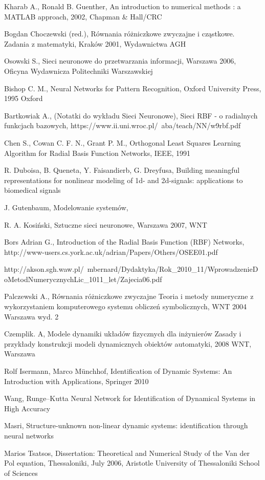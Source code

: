 \begin{thebibliography}{widest-label}

Kharab A., Ronald B. Guenther, An introduction to numerical methods : a MATLAB approach, 2002, Chapman \& Hall/CRC

Bogdan Choczewski (red.), Równania różniczkowe zwyczajne i cząstkowe. Zadania z matematyki, Kraków 2001, Wydawnictwa AGH

Osowski S., Sieci neuronowe do przetwarzania informacji, Warszawa 2006, Oficyna Wydawnicza Politechniki Warszawskiej

Bishop C. M., Neural Networks for Pattern Recognition, Oxford University Press, 1995 Oxford

 Bartkowiak A., (Notatki do wykładu Sieci Neuronowe), Sieci RBF - o radialnych funkcjach bazowych, https://www.ii.uni.wroc.pl/~aba/teach/NN/w9rbf.pdf

 Chen S., Cowan C. F. N., Grant P. M., Orthogonal Least Squares Learning Algorithm for Radial Basis Function Networks, IEEE, 1991

 R. Duboisa, B. Queneta, Y. Faisandierb, G. Dreyfusa, Building meaningful representations for nonlinear modeling of 1d- and 2d-signals: applications to biomedical signals

 J. Gutenbaum, Modelowanie systemów,

 R. A. Kosiński, Sztuczne sieci neuronowe, Warszawa 2007, WNT

 Bors Adrian G., Introduction of the Radial Basis Function (RBF) Networks, http://www-users.cs.york.ac.uk/adrian/Papers/Others/OSEE01.pdf

 http://akson.sgh.waw.pl/~mbernard/Dydaktyka/Rok\_2010\_11/WprowadzenieD oMetodNumerycznychLic\_1011\_let/Zajecia06.pdf

 Palczewski A., Równania różniczkowe zwyczajne
Teoria i metody numeryczne z wykorzystaniem komputerowego systemu obliczeń symbolicznych, WNT 2004 Warszawa wyd. 2

 Czemplik. A, Modele dynamiki układów fizycznych dla inżynierów
Zasady i przykłady konstrukcji modeli dynamicznych obiektów automatyki, 2008 WNT, Warszawa

 Rolf Isermann, Marco Münchhof, Identification of Dynamic Systems: An Introduction with Applications, Springer 2010

 Wang, Runge–Kutta Neural Network for Identification
of Dynamical Systems in High Accuracy

 Masri, Structure-unknown non-linear dynamic
systems: identification through neural
networks

 Marios Tsatsos, Dissertation: Theoretical and Numerical Study of
the Van der Pol equation, Thessaloniki, July 2006, Aristotle University of Thessaloniki
School of Sciences

\end{thebibliography}

